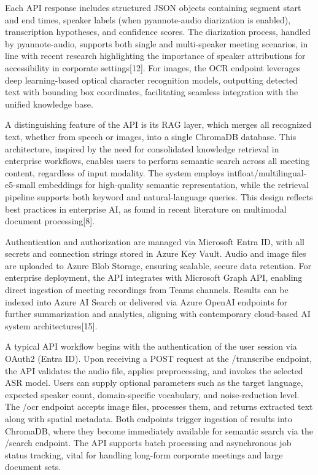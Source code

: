 \documentclass[12pt,a4paper]{article}
\begin{document}
Each API response includes structured JSON objects containing segment start and end times, speaker labels (when pyannote-audio diarization is enabled), transcription hypotheses, and confidence scores. The diarization process, handled by pyannote-audio, supports both single and multi-speaker meeting scenarios, in line with recent research highlighting the importance of speaker attributions for accessibility in corporate settings[12]. For images, the OCR endpoint leverages deep learning-based optical character recognition models, outputting detected text with bounding box coordinates, facilitating seamless integration with the unified knowledge base.


A distinguishing feature of the API is its RAG layer, which merges all recognized text, whether from speech or images, into a single ChromaDB database. This architecture, inspired by the need for consolidated knowledge retrieval in enterprise workflows, enables users to perform semantic search across all meeting content, regardless of input modality. The system employs intfloat/multilingual-e5-small embeddings for high-quality semantic representation, while the retrieval pipeline supports both keyword and natural-language queries. This design reflects best practices in enterprise AI, as found in recent literature on multimodal document processing[8].


Authentication and authorization are managed via Microsoft Entra ID, with all secrets and connection strings stored in Azure Key Vault. Audio and image files are uploaded to Azure Blob Storage, ensuring scalable, secure data retention. For enterprise deployment, the API integrates with Microsoft Graph API, enabling direct ingestion of meeting recordings from Teams channels. Results can be indexed into Azure AI Search or delivered via Azure OpenAI endpoints for further summarization and analytics, aligning with contemporary cloud-based AI system architectures[15].


A typical API workflow begins with the authentication of the user session via OAuth2 (Entra ID). Upon receiving a POST request at the /transcribe endpoint, the API validates the audio file, applies preprocessing, and invokes the selected ASR model. Users can supply optional parameters such as the target language, expected speaker count, domain-specific vocabulary, and noise-reduction level. The /ocr endpoint accepts image files, processes them, and returns extracted text along with spatial metadata. Both endpoints trigger ingestion of results into ChromaDB, where they become immediately available for semantic search via the /search endpoint. The API supports batch processing and asynchronous job status tracking, vital for handling long-form corporate meetings and large document sets.
\end{document}
